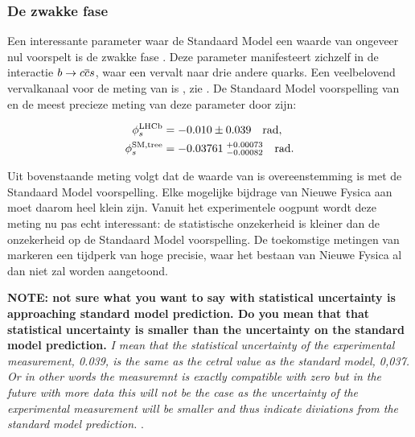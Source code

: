 \subsubsection{De zwakke fase \phis}
Een interessante parameter waar de Standaard Model een waarde van ongeveer nul voorspelt is de zwakke fase \phis. Deze parameter manifesteert zichzelf in de interactie $b\rightarrow c\overline {c}s$, waar een \bquark vervalt naar drie andere quarks. Een veelbelovend vervalkanaal voor de meting van \phis is \BsJpsiPhi, zie . De Standaard Model voorspelling van \phis en de meest precieze meting van deze parameter door \lhcb zijn:

\begin{subequations}
  \label{app_phis_lhcb_theo}
  \begin{align}
  \centering
  \phiS{\lhcb}           &=  -0.010 \pm 0.039  \quad {\rm rad},
  \label{app_phis_lhcb}\\
  \phiS{SM,tree}  &= -0.03761 \; ^{+0.00073}_{-0.00082}  \quad {\rm rad}.
  \label{app_phis_theo}
\end{align}
\end{subequations}


\noindent Uit bovenstaande meting volgt dat de waarde van \phis is overeenstemming is met de Standaard Model voorspelling. Elke mogelijke bijdrage van Nieuwe Fysica aan \phis moet daarom heel klein zijn. Vanuit het experimentele oogpunt wordt deze meting nu pas echt interessant: de statistische onzekerheid is kleiner dan de onzekerheid op de Standaard Model voorspelling. De toekomstige metingen van \phis markeren een tijdperk van hoge precisie, waar het bestaan van Nieuwe Fysica al dan niet zal worden aangetoond.

\textbf{NOTE: not sure what you want to say with statistical uncertainty is approaching standard model prediction. Do you mean that that statistical uncertainty is smaller than the uncertainty on the standard model prediction.}
{\color{green}\it I mean that the statistical uncertainty of the experimental measurement, 0.039, is the
same as the cetral value as the standard model, 0,037. Or in other words the measuremnt is exactly compatible
with zero but in the future with more data this will not be the case as the uncertainty of the experimental
measurement will be smaller and thus indicate diviations from the standard model prediction. }.\\

